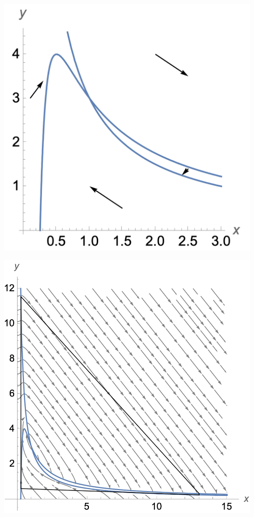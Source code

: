 \documentclass[12pt,letterpaper,answers]{exam}
\begin{document}
\begin{questions}
\begin{parts}
\begin{solution}
\includegraphics{img/PS08S23brusselator.png}

\includegraphics{img/PS08S23brusselatortrap.png}


\end{solution}
\end{parts}
\end{questions}
\end{document}
